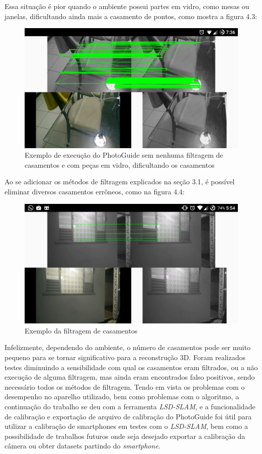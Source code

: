 Essa situação é pior quando o ambiente possui partes em vidro, como mesas ou janelas, dificultando ainda mais a casamento de pontos, como mostra a figura 4.3:

\begin{figure}[!htb]
	\centering
		\includegraphics[width= \textwidth]{Imagens/figura4-3.png}
	\caption{Exemplo de execução do PhotoGuide sem nenhuma filtragem de casamentos e com peças em vidro, dificultando os casamentos}
	\label{fig4:3}
\end{figure}

Ao se adicionar os métodos de filtragem explicados na seção 3.1, é possível eliminar diversos casamentos errôneos, como na figura 4.4:

\begin{figure}[!htb]
	\centering
		\includegraphics[width= \textwidth]{Imagens/figura3-2E4-4.png}
	\caption{Exemplo da filtragem de casamentos}
	\label{fig4:4}
\end{figure}

Infelizmente, dependendo do ambiente, o número de casamentos pode ser muito pequeno para se tornar significativo para a reconstrução 3D. Foram realizados testes diminuindo a sensibilidade com qual os casamentos eram filtrados, ou a não execução de alguma filtragem, mas ainda eram encontrados falso positivos, sendo necessário todos os métodos de filtragem. 
	Tendo em vista os problemas com o desempenho no aparelho utilizado, bem como problemas com o algoritmo, a continuação do trabalho se deu com a ferramenta \textit{LSD-SLAM}, e a funcionalidade de calibração e exportação de arquivo de calibração do PhotoGuide foi útil para utilizar a calibração de smartphones em testes com o \textit{LSD-SLAM}, bem como a possibilidade de trabalhos futuros onde seja desejado exportar a calibração da câmera ou obter datasets partindo do \textit{smartphone}.
	
